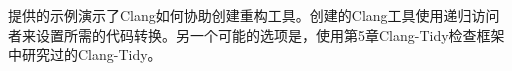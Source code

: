 提供的示例演示了Clang如何协助创建重构工具。创建的Clang工具使用递归访问者来设置所需的代码转换。另一个可能的选项是，使用第5章Clang-Tidy检查框架中研究过的Clang-Tidy。




















































